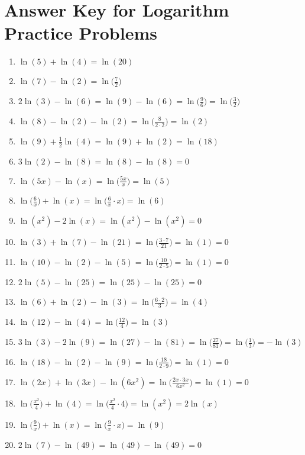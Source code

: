 \documentclass{article}
\begin{document}
\section*{Answer Key for Logarithm Practice Problems}

\begin{enumerate}
  \item $\ln(5) + \ln(4) = \ln(20)$
  \item $\ln(7) - \ln(2) = \ln\!\bigl(\tfrac{7}{2}\bigr)$
  \item $2\ln(3) - \ln(6) = \ln(9) - \ln(6) = \ln\!\bigl(\tfrac{9}{6}\bigr) = \ln\!\bigl(\tfrac{3}{2}\bigr)$
  \item $\ln(8) - \ln(2) - \ln(2) = \ln\!\bigl(\tfrac{8}{2\cdot2}\bigr) = \ln(2)$
  \item $\ln(9) + \tfrac12\ln(4) = \ln(9) + \ln(2) = \ln(18)$
  \item $3\ln(2) - \ln(8) = \ln(8) - \ln(8) = 0$
  \item $\ln(5x) - \ln(x) = \ln\!\bigl(\tfrac{5x}{x}\bigr) = \ln(5)$
  \item $\ln\!\bigl(\tfrac{6}{x}\bigr) + \ln(x) = \ln\!\bigl(\tfrac{6}{x}\cdot x\bigr) = \ln(6)$
  \item $\ln(x^2) - 2\ln(x) = \ln(x^2) - \ln(x^2) = 0$
  \item $\ln(3) + \ln(7) - \ln(21) = \ln\!\bigl(\tfrac{3\cdot7}{21}\bigr) = \ln(1) = 0$
  \item $\ln(10) - \ln(2) - \ln(5) = \ln\!\bigl(\tfrac{10}{2\cdot5}\bigr) = \ln(1) = 0$
  \item $2\ln(5) - \ln(25) = \ln(25) - \ln(25) = 0$
  \item $\ln(6) + \ln(2) - \ln(3) = \ln\!\bigl(\tfrac{6\cdot2}{3}\bigr) = \ln(4)$
  \item $\ln(12) - \ln(4) = \ln\!\bigl(\tfrac{12}{4}\bigr) = \ln(3)$
  \item $3\ln(3) - 2\ln(9) = \ln(27) - \ln(81) = \ln\!\bigl(\tfrac{27}{81}\bigr) = \ln\!\bigl(\tfrac13\bigr) = -\ln(3)$
  \item $\ln(18) - \ln(2) - \ln(9) = \ln\!\bigl(\tfrac{18}{2\cdot9}\bigr) = \ln(1) = 0$
  \item $\ln(2x) + \ln(3x) - \ln(6x^2) = \ln\!\bigl(\tfrac{2x\cdot3x}{6x^2}\bigr) = \ln(1) = 0$
  \item $\ln\!\bigl(\tfrac{x^2}{4}\bigr) + \ln(4) = \ln\!\bigl(\tfrac{x^2}{4}\cdot4\bigr) = \ln(x^2) = 2\ln(x)$
  \item $\ln\!\bigl(\tfrac{9}{x}\bigr) + \ln(x) = \ln\!\bigl(\tfrac{9}{x}\cdot x\bigr) = \ln(9)$
  \item $2\ln(7) - \ln(49) = \ln(49) - \ln(49) = 0$
\end{enumerate}
\end{document}

